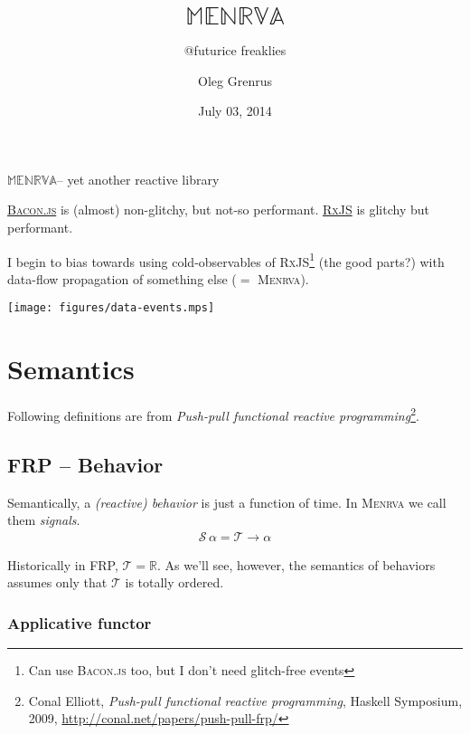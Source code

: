 \documentclass[10pt,fleqn]{article}
\title{$\mathbb{MENRVA}$}
\subtitle{@futurice freaklies}
\author{Oleg Grenrus}
\date{July 03, 2014}
\theoremstyle{definition}
\theoremstyle{plain}
\begin{document}
\maketitle
\thispagestyle{empty}
\newpage

{\LARGE$\mathbb{MENRVA}$-- yet another reactive library}

\href{https://github.com/baconjs/bacon.js}{\textsc{Bacon.js}} is (almost) non-glitchy, but not-so performant.
\href{https://github.com/Reactive-Extensions/RxJS}{\textsc{RxJS}} is glitchy but performant.

I begin to bias towards using cold-observables of \textsc{RxJS}\footnote{Can use \textsc{Bacon.js} too, but I don't need glitch-free events} (the good parts?) with data-flow propagation of something else ($=$ \textsc{Menrva}).

\begin{center}
\texttt{[image: figures/data-events.mps]}
\end{center}

\newpage

\section*{Semantics}

Following definitions are from \emph{Push-pull functional reactive programming}\footnote{Conal Elliott, \emph{Push-pull functional reactive programming}, Haskell Symposium, 2009, \url{http://conal.net/papers/push-pull-frp/}}.

\subsection*{FRP -- Behavior}

Semantically, a \emph{(reactive) behavior} is just a function of time. In \textsc{Menrva} we call them \emph{signals}.
\begin{align*}
\mathcal{S}\,\alpha = \mathcal{T} \to \alpha
\end{align*}

Historically in FRP, $\mathcal{T} = \mathbb{R}$. As we’ll see, however, the semantics of behaviors assumes only that $\mathcal{T}$ is totally ordered. 

\newpage

\subsubsection*{Applicative functor}
\end{document}
